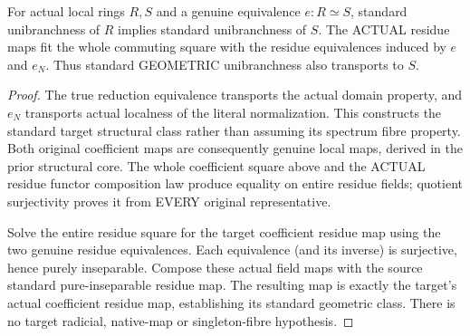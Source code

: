\begin{theorem}
\label{algebra:actual-structural-unibranch-ring-equivalence}
For actual local rings $R,S$ and a genuine equivalence $e:R\simeq S$,
standard unibranchness of $R$ implies standard unibranchness of $S$.
The ACTUAL residue maps fit the whole commuting square with the
residue equivalences induced by $e$ and $e_N$. Thus standard
GEOMETRIC unibranchness also transports to $S$.
\leanok
\end{theorem}
\begin{proof}
The true reduction equivalence transports the actual domain property,
and $e_N$ transports actual localness of the literal normalization.
This constructs the standard target structural class rather than
assuming its spectrum fibre property. Both original coefficient maps
are consequently genuine local maps, derived in the prior structural
core. The whole coefficient square above and the ACTUAL residue
functor composition law produce equality on entire residue fields;
quotient surjectivity proves it from EVERY original representative.

Solve the entire residue square for the target coefficient residue
map using the two genuine residue equivalences. Each equivalence
(and its inverse) is surjective, hence purely inseparable. Compose
these actual field maps with the source standard pure-inseparable
residue map. The resulting map is exactly the target's actual
coefficient residue map, establishing its standard geometric class.
There is no target radicial, native-map or singleton-fibre hypothesis.
\end{proof}

